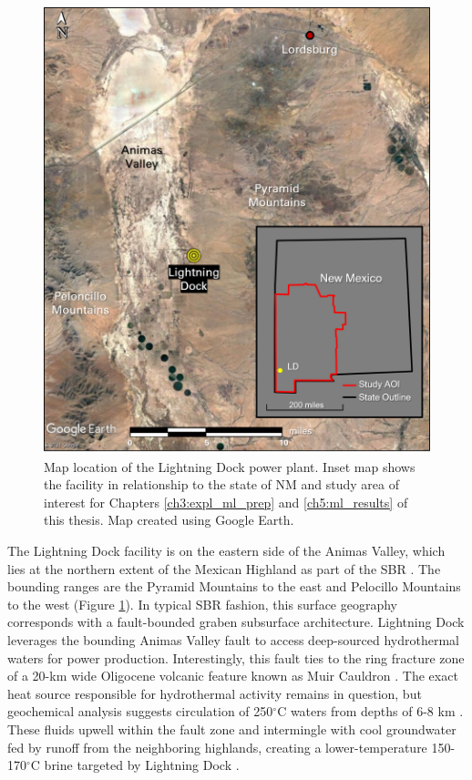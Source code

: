 \begin{figure}%
\centering
\includegraphics[width=.85\textwidth]{templates/images/Figure-Lightning_Dock_Location_composite.png}
\caption[Lightning Dock power plant location map]{Map location of the Lightning Dock power plant. Inset map shows the facility in relationship to the state of NM and study area of interest for Chapters \ref{ch3:expl_ml_prep} and \ref{ch5:ml_results} of this thesis. Map created using Google Earth.}
\label{fig:lightning_dock_map}
\end{figure}

The Lightning Dock facility is on the eastern side of the Animas Valley, which lies at the northern extent of the Mexican Highland as part of the SBR \citep{cunniff_final_2005}. The bounding ranges are the Pyramid Mountains to the east and Pelocillo Mountains to the west (Figure \ref{fig:lightning_dock_map}). In typical SBR fashion, this surface geography corresponds with a fault-bounded graben subsurface architecture. Lightning Dock leverages the bounding Animas Valley fault to access deep-sourced hydrothermal waters for power production. Interestingly, this fault ties to the ring fracture zone of a 20-km wide Oligocene volcanic feature known as Muir Cauldron \citep{elston_geology_1983}. The exact heat source responsible for hydrothermal activity remains in question, but geochemical analysis suggests circulation of 250$^\circ$C waters from depths of 6-8 km \citep{schochet_development_2001}. These fluids upwell within the fault zone and intermingle with cool groundwater fed by runoff from the neighboring highlands, creating a lower-temperature 150-170$^\circ$C brine targeted by Lightning Dock \citep{crowell_history_2014}.

